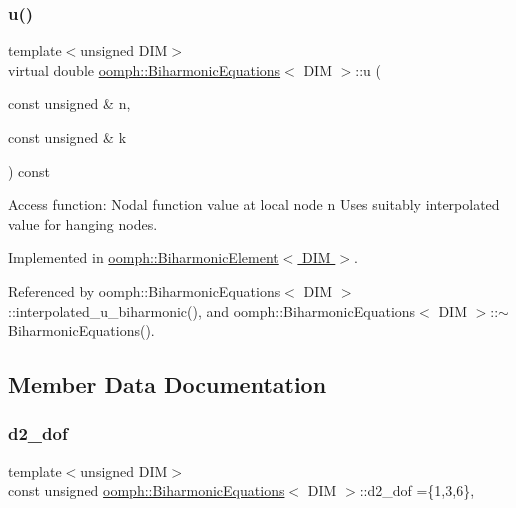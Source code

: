 \subsubsection{\texorpdfstring{u()}{u()}}
{\footnotesize\ttfamily template$<$unsigned D\+IM$>$ \\
virtual double \hyperlink{classoomph_1_1BiharmonicEquations}{oomph\+::\+Biharmonic\+Equations}$<$ D\+IM $>$\+::u (\begin{DoxyParamCaption}\item[{const unsigned \&}]{n,  }\item[{const unsigned \&}]{k }\end{DoxyParamCaption}) const\hspace{0.3cm}{\ttfamily [pure virtual]}}

Access function\+: Nodal function value at local node n Uses suitably interpolated value for hanging nodes. 

Implemented in \hyperlink{classoomph_1_1BiharmonicElement_ada3127693270368783121dfbef92d35d}{oomph\+::\+Biharmonic\+Element$<$ D\+I\+M $>$}.



Referenced by oomph\+::\+Biharmonic\+Equations$<$ D\+I\+M $>$\+::interpolated\+\_\+u\+\_\+biharmonic(), and oomph\+::\+Biharmonic\+Equations$<$ D\+I\+M $>$\+::$\sim$\+Biharmonic\+Equations().



\subsection{Member Data Documentation}
\mbox{\label{classoomph_1_1BiharmonicEquations_a43f2c15a2438a7710738a3f6faca6e61}} 
\subsubsection{\texorpdfstring{d2\+\_\+dof}{d2\_dof}}
{\footnotesize\ttfamily template$<$unsigned D\+IM$>$ \\
const unsigned \hyperlink{classoomph_1_1BiharmonicEquations}{oomph\+::\+Biharmonic\+Equations}$<$ D\+IM $>$\+::d2\+\_\+dof =\{1,3,6\}\hspace{0.3cm}{\ttfamily [static]}, {\ttfamily [private]}}



